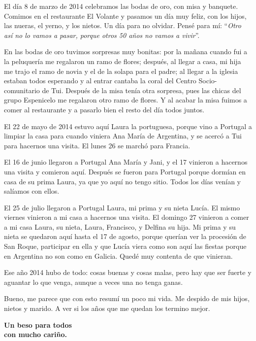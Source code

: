 \documentclass[12pt,a5paper]{book}
\begin{document}
El día 8 de marzo de 2014 celebramos las bodas de oro, con misa y banquete. Comimos en el restaurante El Volante y pasamos un día muy feliz, con los hijos, las nueras, el yerno, y los nietos. Un día para no olvidar. Pensé para mí: ``\textit{Otro así no lo vamos a pasar, porque otros 50 años no vamos a vivir}''. 

En las bodas de oro tuvimos sorpresas muy bonitas: por la mañana cuando fui a la peluquería me regalaron un ramo de flores; después, al llegar a casa, mi hija me trajo el ramo de novia y el de la solapa para el padre; al llegar a la iglesia estaban todos esperando y al entrar cantaba la coral del Centro Socio-comunitario de Tui. Después de la misa tenía otra sorpresa, pues las chicas del grupo Espenicelo me regalaron otro ramo de flores. Y al acabar la misa fuimos a comer al restaurante y a pasarlo bien el resto del día todos juntos.

El 22 de mayo de 2014 estuvo aquí Laura la portuguesa, porque vino a Portugal a limpiar la casa para cuando viniera Ana María de Argentina, y se acercó a Tui para hacernos una visita. El lunes 26 se marchó para Francia.

El 16 de junio llegaron a Portugal Ana María y Jani, y el 17 vinieron a hacernos una visita y comieron aquí. Después se fueron para Portugal porque dormían en casa de su prima Laura, ya que yo aquí no tengo sitio. Todos los días venían y salíamos con ellos.

El 25 de julio llegaron a Portugal Laura, mi prima y su nieta Lucía. El mismo viernes vinieron a mi casa a hacernos una visita. El domingo 27 vinieron a comer a mi casa Laura, su nieta, Laura, Francisco, y Delfina su hija. Mi prima y su nieta se quedaron aquí hasta el 17 de agosto, porque querían ver la procesión de San Roque, participar en ella y que Lucía viera como son aquí las fiestas porque en Argentina no son como en Galicia. Quedé muy contenta de que vinieran.

Ese año 2014 hubo de todo: cosas buenas y cosas malas, pero hay que ser fuerte y aguantar lo que venga, aunque a veces una no tenga ganas.

Bueno, me parece que con esto resumí un poco mi vida. Me despido de mis hijos, nietos y marido. A ver si los años que me quedan los termino mejor.



\begin{center}
\textbf{Un beso para todos}\\
\textbf{con mucho cariño.}
\end{center}
\end{document}
